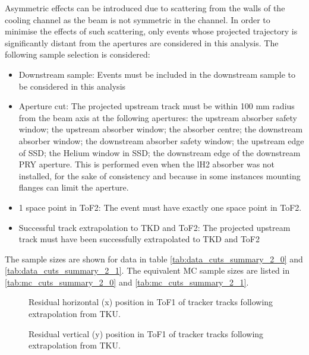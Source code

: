 Asymmetric effects can be introduced due to scattering from the walls of the
cooling channel as the beam is not symmetric in the channel. In order to 
minimise the effects of such scattering, only events whose projected 
trajectory is  significantly distant from the apertures are considered in this 
analysis. The following sample selection is considered:

\begin{itemize}
\item{Downstream sample:} Events must be included in the downstream sample to
be considered in this analysis
\item{Aperture cut:} The projected upstream track must be within 100 mm radius 
from the beam axis at the following apertures: the upstream absorber safety window;
the upstream absorber window; the absorber centre; the downstream absorber window;
the downstream absorber safety window; the upstream edge of SSD; the Helium window
in SSD; the downstream edge of the downstream PRY aperture. This is performed
even when the lH2 absorber was not installed, for the sake of consistency and
because in some instances mounting flanges can limit the aperture.
\item{1 space point in ToF2:} The event must have exactly one space point in ToF2.
\item{Successful track extrapolation to TKD and ToF2:} The projected upstream track must
have been successfully extrapolated to TKD and ToF2
\end{itemize}

The sample sizes are shown for data in table \ref{tab:data_cuts_summary_2_0} and
\ref{tab:data_cuts_summary_2_1}. The equivalent MC sample sizes are listed in 
\ref{tab:mc_cuts_summary_2_0} and \ref{tab:mc_cuts_summary_2_1}.

\let\splitcell\undefined

\let\splitcell\undefined

\let\splitcell\undefined

\begin{figure}[!tbh]
    \centering
    {Residual horizontal (x) position in ToF1 of tracker tracks following extrapolation from TKU. \label{fig:tof1_extrapolated_x}}
\end{figure}

\begin{figure}[!tbh]
    \centering
    {Residual vertical (y) position in ToF1 of tracker tracks following extrapolation from TKU. \label{fig:tof1_extrapolated_y}}
\end{figure}

